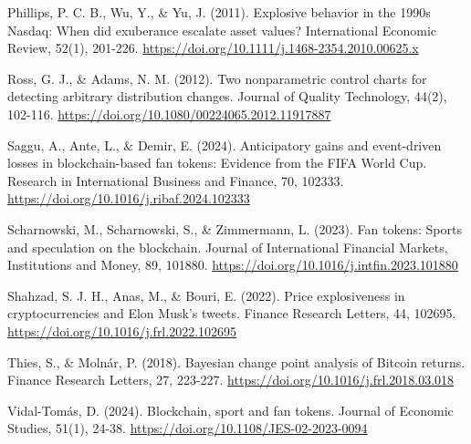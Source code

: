 \documentclass[11pt,a4paper,onecolumn]{article}
\newenvironment{reportreference}{\begingroup\small\setlength{\parskip}{5pt}\leftskip=5mm\parindent=-5mm}{\par\endgroup}
\begin{document}
\begin{reportreference}
Phillips, P. C. B., Wu, Y., \& Yu, J. (2011). Explosive behavior in the 1990s Nasdaq: When did exuberance escalate asset values? International Economic Review, 52(1), 201-226. \url{https://doi.org/10.1111/j.1468-2354.2010.00625.x}
\end{reportreference}

\begin{reportreference}
Ross, G. J., \& Adams, N. M. (2012). Two nonparametric control charts for detecting arbitrary distribution changes. Journal of Quality Technology, 44(2), 102-116. \url{https://doi.org/10.1080/00224065.2012.11917887}
\end{reportreference}

\begin{reportreference}
Saggu, A., Ante, L., \& Demir, E. (2024). Anticipatory gains and event-driven losses in blockchain-based fan tokens: Evidence from the FIFA World Cup. Research in International Business and Finance, 70, 102333. \url{https://doi.org/10.1016/j.ribaf.2024.102333}
\end{reportreference}

\begin{reportreference}
Scharnowski, M., Scharnowski, S., \& Zimmermann, L. (2023). Fan tokens: Sports and speculation on the blockchain. Journal of International Financial Markets, Institutions and Money, 89, 101880. \url{https://doi.org/10.1016/j.intfin.2023.101880}
\end{reportreference}

\begin{reportreference}
Shahzad, S. J. H., Anas, M., \& Bouri, E. (2022). Price explosiveness in cryptocurrencies and Elon Musk's tweets. Finance Research Letters, 44, 102695. \url{https://doi.org/10.1016/j.frl.2022.102695}
\end{reportreference}

\begin{reportreference}
Thies, S., \& Molnár, P. (2018). Bayesian change point analysis of Bitcoin returns. Finance Research Letters, 27, 223-227. \url{https://doi.org/10.1016/j.frl.2018.03.018}
\end{reportreference}

\begin{reportreference}
Vidal-Tomás, D. (2024). Blockchain, sport and fan tokens. Journal of Economic Studies, 51(1), 24-38. \url{https://doi.org/10.1108/JES-02-2023-0094}
\end{reportreference}
\end{document}
